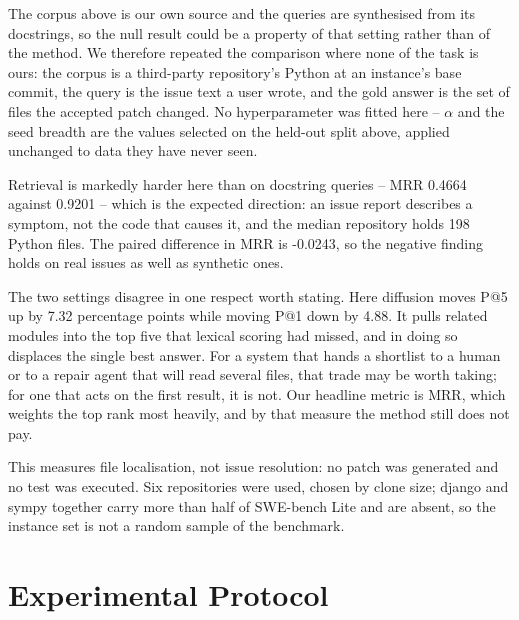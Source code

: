 \documentclass[10pt,journal,compsoc,twocolumn]{IEEEtran}
\begin{document}
The corpus above is our own source and the queries are synthesised from its
docstrings, so the null result could be a property of that setting rather than of
the method. We therefore repeated the comparison where none of the task is ours:
the corpus is a third-party repository's Python at an instance's base commit, the
query is the issue text a user wrote, and the gold answer is the set of files the
accepted patch changed. No hyperparameter was fitted here -- $\alpha$ and the
seed breadth are the values selected on the held-out split above, applied
unchanged to data they have never seen.
\begin{table}[htbp]
\centering
{}
\end{table}

Retrieval is markedly harder here than on docstring queries -- MRR
0.4664 against 0.9201 -- which is the
expected direction: an issue report describes a symptom, not the code that causes
it, and the median repository holds 198
Python files. The paired difference in MRR is
-0.0243, so the negative finding holds on real
issues as well as synthetic ones.

The two settings disagree in one respect worth stating. Here diffusion moves P@5
up by 7.32
percentage points while moving P@1 down by
4.88. It
pulls related modules into the top five that lexical scoring had missed, and in
doing so displaces the single best answer. For a system that hands a shortlist to
a human or to a repair agent that will read several files, that trade may be
worth taking; for one that acts on the first result, it is not. Our headline
metric is MRR, which weights the top rank most heavily, and by that measure the
method still does not pay.

This measures file localisation, not issue resolution: no patch was generated and
no test was executed. Six repositories were used, chosen by clone size; django and
sympy together carry more than half of SWE-bench Lite and are absent, so the
instance set is not a random sample of the benchmark.




\section{Experimental Protocol}
\end{document}
